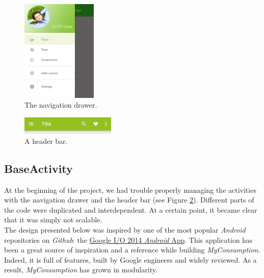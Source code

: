 \documentclass[a4paper, oneside, 11pt]{book}
\begin{document}
\begin{figure}[htbp]
	\centerline{\includegraphics[width=0.32\textwidth]{nav_drawer.png}}
	\caption{The navigation drawer.}
	\label{fig:nav_drawer}
\end{figure}

\begin{figure}[htbp]
	\centerline{\includegraphics[width=0.4\textwidth]{headerbar.png}}
	\caption{A header bar.}
	\label{fig:headerbar}
\end{figure}

\subsection{BaseActivity}
At the beginning of the project, we had trouble properly managing the activities with the navigation drawer and the header bar (see Figure \ref{fig:headerbar}). Different parts of the code were duplicated and interdependent. At a certain point, it became clear that it was simply not scalable.\\

The design presented below was inspired by one of the most popular \textit{Android} repositories on \textit{Github}: the \href{https://github.com/google/iosched}{Google I/O 2014 \textit{Android} App}. This application has been a great source of inspiration and a reference while building \textit{MyConsumption}. Indeed, it is full of features, built by Google engineers and widely reviewed. As a result, \textit{MyConsumption} has grown in modularity.\\
\end{document}
